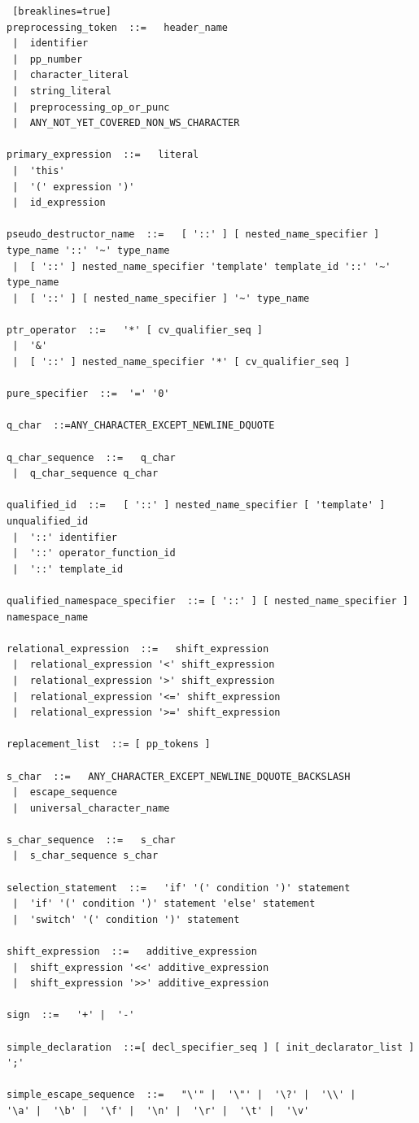 \documentclass[11pt]{book}
\begin{document}
\begin{lstlisting} [breaklines=true]
preprocessing_token  ::=   header_name
 |  identifier
 |  pp_number
 |  character_literal
 |  string_literal
 |  preprocessing_op_or_punc
 |  ANY_NOT_YET_COVERED_NON_WS_CHARACTER

primary_expression  ::=   literal
 |  'this'
 |  '(' expression ')'
 |  id_expression

pseudo_destructor_name  ::=   [ '::' ] [ nested_name_specifier ] type_name '::' '~' type_name
 |  [ '::' ] nested_name_specifier 'template' template_id '::' '~' type_name
 |  [ '::' ] [ nested_name_specifier ] '~' type_name

ptr_operator  ::=   '*' [ cv_qualifier_seq ]
 |  '&'
 |  [ '::' ] nested_name_specifier '*' [ cv_qualifier_seq ]

pure_specifier  ::=  '=' '0'

q_char  ::=ANY_CHARACTER_EXCEPT_NEWLINE_DQUOTE

q_char_sequence  ::=   q_char
 |  q_char_sequence q_char

qualified_id  ::=   [ '::' ] nested_name_specifier [ 'template' ] unqualified_id
 |  '::' identifier
 |  '::' operator_function_id
 |  '::' template_id

qualified_namespace_specifier  ::= [ '::' ] [ nested_name_specifier ] namespace_name

relational_expression  ::=   shift_expression
 |  relational_expression '<' shift_expression
 |  relational_expression '>' shift_expression
 |  relational_expression '<=' shift_expression
 |  relational_expression '>=' shift_expression

replacement_list  ::= [ pp_tokens ]

s_char  ::=   ANY_CHARACTER_EXCEPT_NEWLINE_DQUOTE_BACKSLASH
 |  escape_sequence
 |  universal_character_name

s_char_sequence  ::=   s_char
 |  s_char_sequence s_char

selection_statement  ::=   'if' '(' condition ')' statement
 |  'if' '(' condition ')' statement 'else' statement
 |  'switch' '(' condition ')' statement

shift_expression  ::=   additive_expression
 |  shift_expression '<<' additive_expression
 |  shift_expression '>>' additive_expression

sign  ::=   '+' |  '-'

simple_declaration  ::=[ decl_specifier_seq ] [ init_declarator_list ] ';'

simple_escape_sequence  ::=   "\'" |  '\"' |  '\?' |  '\\' | 
'\a' |  '\b' |  '\f' |  '\n' |  '\r' |  '\t' |  '\v'
 

\end{lstlisting}
\end{document}
